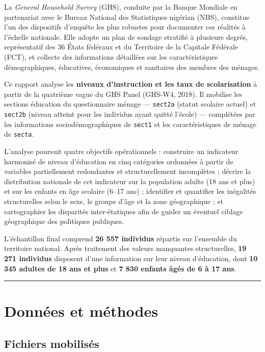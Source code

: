\documentclass[
]{article}
\begin{document}
La \emph{General Household Survey} (GHS), conduite par la Banque
Mondiale en partenariat avec le Bureau National des Statistiques
nigérian (NBS), constitue l'un des dispositifs d'enquête les plus
robustes pour documenter ces réalités à l'échelle nationale. Elle adopte
un plan de sondage stratifié à plusieurs degrés, représentatif des 36
États fédéraux et du Territoire de la Capitale Fédérale (FCT), et
collecte des informations détaillées sur les caractéristiques
démographiques, éducatives, économiques et sanitaires des membres des
ménages.

Ce rapport analyse les \textbf{niveaux d'instruction et les taux de
scolarisation} à partir de la quatrième vague du GHS Panel (GHS-W4,
2018). Il mobilise les sections éducation du questionnaire ménage ---
\texttt{sect2a} (statut scolaire actuel) et \texttt{sect2b} (niveau
atteint pour les individus ayant quitté l'école) --- complétées par les
informations sociodémographiques de \texttt{sect1} et les
caractéristiques de ménage de \texttt{secta}.

L'analyse poursuit quatre objectifs opérationnels : construire un
indicateur harmonisé de niveau d'éducation en cinq catégories ordonnées
à partir de variables partiellement redondantes et structurellement
incomplètes ; décrire la distribution nationale de cet indicateur sur la
population adulte (18 ans et plus) et sur les enfants en âge scolaire
(6--17 ans) ; identifier et quantifier les inégalités structurelles
selon le sexe, le groupe d'âge et la zone géographique ; et
cartographier les disparités inter-étatiques afin de guider un éventuel
ciblage géographique des politiques publiques.

L'échantillon final comprend \textbf{26 557 individus} répartis sur
l'ensemble du territoire national. Après traitement des valeurs
manquantes structurelles, \textbf{19 271 individus} disposent d'une
information sur leur niveau d'éducation, dont \textbf{10 345 adultes de
18 ans et plus} et \textbf{7 830 enfants âgés de 6 à 17 ans}.

\begin{center}\rule{0.5\linewidth}{0.5pt}\end{center}

\section{Données et méthodes}\label{donnuxe9es-et-muxe9thodes}

\subsection{Fichiers mobilisés}\label{fichiers-mobilisuxe9s}
\end{document}
